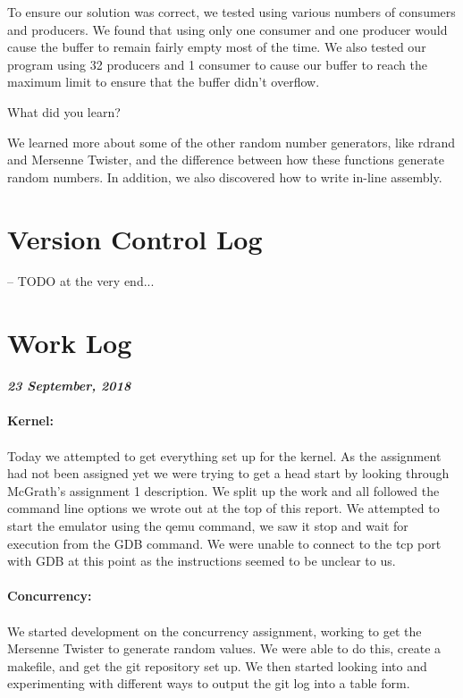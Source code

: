 \documentclass{article}
\newenvironment{question}[2][Question]	{\begin{trivlist}
\item[\hskip \labelsep {\bfseries #1}\hskip \labelsep {\bfseries #2.}]}
{\end{trivlist}} %
\begin{document}
To ensure our solution was correct, we tested using various numbers of consumers and producers. We found that using only one consumer and one producer would cause the buffer to remain fairly empty most of the time. We also tested our program using 32 producers and 1 consumer to cause our buffer to reach the maximum limit to ensure that the buffer didn't overflow.

\begin{question}{4}
What did you learn?
\end{question}

We learned more about some of the other random number generators, like rdrand and Mersenne Twister, and the difference between how these functions generate random numbers. In addition, we also discovered how to write in-line assembly. 

\section{Version Control Log}
-- TODO at the very end...

\section{Work Log}

\textit{\textbf{23 September, 2018}} \\\\
\textbf{Kernel:} \\\\
\indent Today we attempted to get everything set up for the kernel. As the assignment had not been assigned yet we were trying to get a head start by looking through McGrath's assignment 1 description. We split up the work and all followed the command line options we wrote out at the top of this report. We attempted to start the emulator using the qemu command, we saw it stop and wait for execution from the GDB command. We were unable to connect to the tcp port with GDB at this point as the instructions seemed to be unclear to us.
\\\\
\textbf{Concurrency:} \\\\
\indent We started development on the concurrency assignment, working to get the Mersenne Twister to generate random values. We were able to do this, create a makefile, and get the git repository set up. We then started looking into and experimenting with different ways to output the git log into a table form.
\\\\
\end{document}
